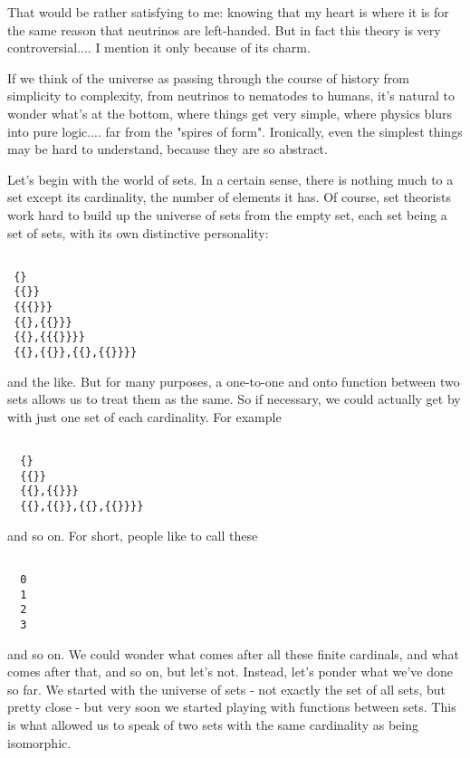 That would be rather satisfying to me: knowing that my heart is where it
is for the same reason that neutrinos are left-handed.  But in fact this
theory is very controversial.... I mention it only because of its charm.


If we think of the universe as passing through the course of history
from simplicity to complexity, from neutrinos to nematodes to humans,
it's natural to wonder what's at the bottom, where things get very
simple, where physics blurs into pure logic.... far from the "spires of
form".  Ironically, even the simplest things may be hard to understand, 
because they are so abstract.  

Let's begin with the world of sets.  In a certain sense, there is
nothing much to a set except its cardinality, the number of elements it
has.  Of course, set theorists work hard to build up the universe of
sets from the empty set, each set being a set of sets, with its own
distinctive personality:


\begin{verbatim}

 {}
 {{}}
 {{{}}}
 {{},{{}}}
 {{},{{{}}}}
 {{},{{}},{{},{{}}}}

\end{verbatim}
    
and the like.  But for many purposes, a one-to-one and onto function
between two sets allows us to treat them as the same.  So if necessary,
we could actually get by with just one set of each cardinality.  For
example 


\begin{verbatim}

  {}
  {{}}
  {{},{{}}}
  {{},{{}},{{},{{}}}}

\end{verbatim}
    
and so on.  For short, people like to call these


\begin{verbatim}

  0
  1
  2
  3

\end{verbatim}
    
and so on.  We could wonder what comes after all these finite cardinals,
and what comes after that, and so on, but let's not.  Instead, let's
ponder what we've done so far.  We started with the universe of sets -
not exactly the set of all sets, but pretty close - but very soon we
started playing with functions between sets.  This is what allowed us to
speak of two sets with the same cardinality as being isomorphic.

